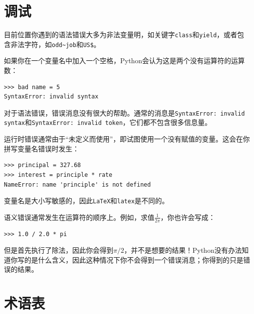 \section{调试}

目前位置你遇到的语法错误大多为非法变量明，如关键字{\tt class}和{\tt yield}，或者包含非法字符，如\verb"odd~job"和\verb"US$"。


如果你在一个变量名中加入一个空格，Python会认为这是两个没有运算符的运算数：

\beforeverb
\begin{verbatim}
>>> bad name = 5
SyntaxError: invalid syntax
\end{verbatim}
\afterverb
%
对于语法错误，错误消息没有很大的帮助。通常的消息是{\tt SyntaxError: invalid syntax}和{\tt SyntaxError: invalid token}，它们都不包含很多信息量。


运行时错误通常由于“未定义而使用”，即试图使用一个没有赋值的变量。这会在你拼写变量名错误时发生：

\beforeverb
\begin{verbatim}
>>> principal = 327.68
>>> interest = principle * rate
NameError: name 'principle' is not defined
\end{verbatim}
\afterverb
%
变量名是大小写敏感的，因此{\tt LaTeX}和{\tt latex}是不同的。


语义错误通常发生在运算符的顺序上。例如，求值$\frac{1}{2 \pi}$，你也许会写成：

\beforeverb
\begin{verbatim}
>>> 1.0 / 2.0 * pi
\end{verbatim}
\afterverb
%
但是首先执行了除法，因此你会得到$\pi / 2$，并不是想要的结果！Python没有办法知道你写的是什么含义，因此这种情况下你不会得到一个错误消息；你得到的只是错误的结果。


\section{术语表}

